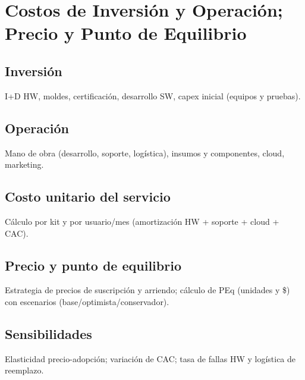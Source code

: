 \section{Costos de Inversión y Operación; Precio y Punto de Equilibrio}
\subsection{Inversión}
I+D HW, moldes, certificación, desarrollo SW, capex inicial (equipos y pruebas).

\subsection{Operación}
Mano de obra (desarrollo, soporte, logística), insumos y componentes, cloud, marketing.

\subsection{Costo unitario del servicio}
Cálculo por kit y por usuario/mes (amortización HW + soporte + cloud + CAC). 

\subsection{Precio y punto de equilibrio}
Estrategia de precios de suscripción y arriendo; cálculo de PEq (unidades y \$) con escenarios (base/optimista/conservador).

\subsection{Sensibilidades}
Elasticidad precio-adopción; variación de CAC; tasa de fallas HW y logística de reemplazo.
